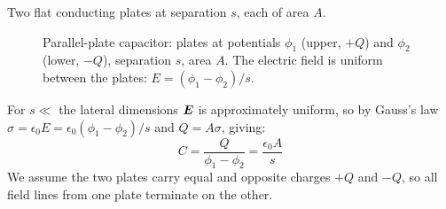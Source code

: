 \begin{example}
Two flat conducting plates at separation $s$, each of area $A$.

\begin{figure}[H]
\begin{center}
\end{center}
\caption{Parallel-plate capacitor: plates at potentials $\phi_1$ (upper, $+Q$) and $\phi_2$ (lower, $-Q$), separation $s$, area $A$. The electric field is uniform between the plates: $E = (\phi_1-\phi_2)/s$.}
\end{figure}

For $s\ll$ the lateral dimensions $\vect{E}$ is approximately uniform, so by Gauss's law $\sigma = \epsilon_0 E = \epsilon_0(\phi_1-\phi_2)/s$ and $Q = A\sigma$, giving:
\[
    C = \frac{Q}{\phi_1 - \phi_2} = \frac{\epsilon_0 A}{s}
\]
We assume the two plates carry equal and opposite charges $+Q$ and $-Q$, so all field lines from one plate terminate on the other.
\end{example}

